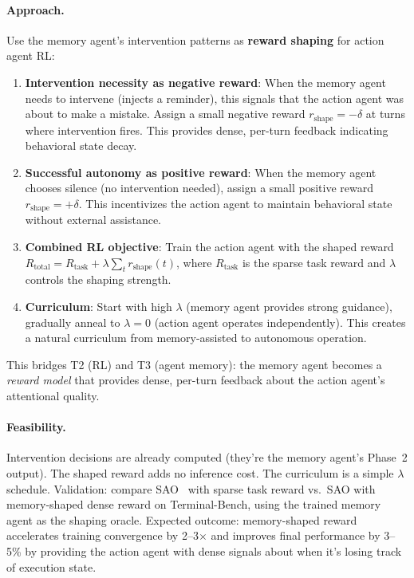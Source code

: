 \documentclass[11pt,a4paper]{article}
\begin{document}
\paragraph{Approach.} Use the memory agent's intervention patterns as \textbf{reward shaping} for action agent RL:
\begin{enumerate}
\item \textbf{Intervention necessity as negative reward}: When the memory agent needs to intervene (injects a reminder), this signals that the action agent was about to make a mistake. Assign a small negative reward $r_{\mathrm{shape}} = -\delta$ at turns where intervention fires. This provides dense, per-turn feedback indicating behavioral state decay.
\item \textbf{Successful autonomy as positive reward}: When the memory agent chooses silence (no intervention needed), assign a small positive reward $r_{\mathrm{shape}} = +\delta$. This incentivizes the action agent to maintain behavioral state without external assistance.
\item \textbf{Combined RL objective}: Train the action agent with the shaped reward $R_{\mathrm{total}} = R_{\mathrm{task}} + \lambda \sum_t r_{\mathrm{shape}}(t)$, where $R_{\mathrm{task}}$ is the sparse task reward and $\lambda$ controls the shaping strength.
\item \textbf{Curriculum}: Start with high $\lambda$ (memory agent provides strong guidance), gradually anneal to $\lambda = 0$ (action agent operates independently). This creates a natural curriculum from memory-assisted to autonomous operation.
\end{enumerate}
This bridges T2 (RL) and T3 (agent memory): the memory agent becomes a \emph{reward model} that provides dense, per-turn feedback about the action agent's attentional quality.

\paragraph{Feasibility.} Intervention decisions are already computed (they're the memory agent's Phase~2 output). The shaped reward adds no inference cost. The curriculum is a simple $\lambda$ schedule. Validation: compare SAO~\cite{sao2026} with sparse task reward vs.\ SAO with memory-shaped dense reward on Terminal-Bench, using the trained memory agent as the shaping oracle. Expected outcome: memory-shaped reward accelerates training convergence by 2--3$\times$ and improves final performance by 3--5\% by providing the action agent with dense signals about when it's losing track of execution state.
\end{document}
